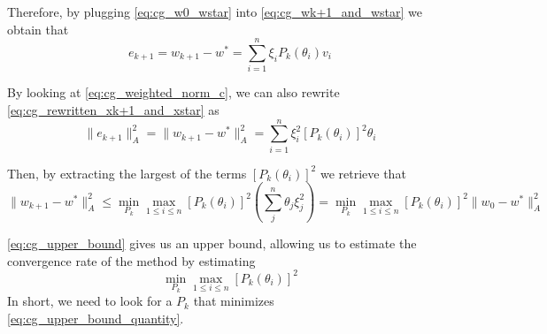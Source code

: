 \noindent Therefore, by plugging \eqref{eq:cg_w0_wstar} into \eqref{eq:cg_wk+1_and_wstar} we obtain that
\begin{equation}
    e_{k+1}=w_{k+1}-w^*=\sum_{i=1}^n\xi_i P_k(\theta_i)v_i
    \label{eq:cg_rewritten_xk+1_and_xstar}
\end{equation}

\noindent By looking at \eqref{eq:cg_weighted_norm_c}, we can also rewrite \eqref{eq:cg_rewritten_xk+1_and_xstar} as
\begin{equation}
    \lVert e_{k+1}\rVert_A^2=\lVert w_{k+1}-w^*\rVert^2_A=\sum_{i=1}^n\xi_i^2[P_k(\theta_i)]^2\theta_i
\end{equation}

\noindent Then, by extracting the largest of the terms $[P_k(\theta_i)]^2$ we retrieve that
\begin{equation}
     \lVert w_{k+1}-w^*\rVert^2_A\leq \min_{P_k} \max_{1\leq i\leq n}[P_k(\theta_i)]^2(\sum_{j}^n\theta_j\xi^2_j)=\min_{P_k} \max_{1\leq i\leq n}[P_k(\theta_i)]^2\lVert w_0-w^*\rVert_A^2
     \label{eq:cg_upper_bound}
\end{equation}

\noindent \eqref{eq:cg_upper_bound} gives us an upper bound, allowing us to estimate the convergence rate of the method by estimating
\begin{equation}
    \min_{P_k} \max_{1\leq i\leq n}[P_k(\theta_i)]^2
    \label{eq:cg_upper_bound_quantity}
\end{equation}
In short, we need to look for a $P_k$ that minimizes \eqref{eq:cg_upper_bound_quantity}.
\vspace{3mm}

